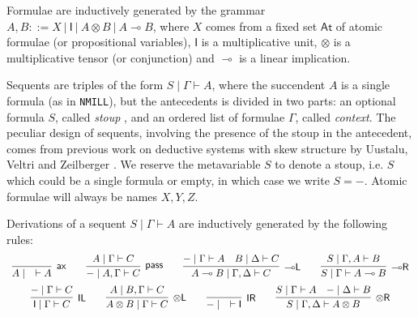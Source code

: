 \documentclass[submission,copyright,creativecommons]{eptcs}
\theoremstyle{definition}
\newtheorem{defn}{Definition}[section]
\newcommand{\tl}{\otimes \mathsf{L}}
\newcommand{\tr}{\otimes \mathsf{R}}
\newcommand{\lright}{{\multimap}\mathsf{R}}
\newcommand{\lleft}{{\multimap}\mathsf{L}}
\newcommand{\pass}{\mathsf{pass}}
\newcommand{\unitl}{\mathsf{IL}}
\newcommand{\unitr}{\mathsf{IR}}
\newcommand{\ax}{\mathsf{ax}}
\newcommand{\ot}{\otimes}
\newcommand{\lolli}{\multimap}
\newcommand{\I}{\mathsf{I}}
\newcommand{\NMILL}{\texttt{NMILL}}
\newcommand{\niccolo}[1]{{\color{red}\textbf{Niccol{\`o}: }#1}}
\begin{document}
Formulae are inductively generated by the grammar $A,B ::= X \ | \ \I \ | \ A \ot B \ | \ A \lolli B$, where $X$ comes from a fixed set $\mathsf{At}$ of atomic formulae (or propositional variables), $\I$ is a multiplicative unit, $\ot$ is a multiplicative tensor (or conjunction) and $\lolli$ is a linear implication.

Sequents are triples of the form $S \mid \Gamma \vdash A$, where the succendent $A$ is a single formula (as in \NMILL), but the antecedents is divided in two parts: an optional formula $S$, called \emph{stoup} \cite{girard:constructive:91}, and an ordered list of formulae $\Gamma$, called \emph{context}. The peculiar design of sequents, involving the presence of the stoup in the antecedent, comes from previous work on deductive systems with skew structure by Uustalu, Veltri and Zeilberger \cite{uustalu:sequent:2021,uustalu:proof:nodate,uustalu:deductive:nodate,veltri:coherence:2021}.
We reserve the metavariable $S$ to denote a stoup, i.e. $S$ which could be a single formula or empty, in which case we write $S = -$. Atomic formulae will always be names $X,Y,Z$.

Derivations of a sequent $S \mid \Gamma \vdash A$ are inductively generated by the following rules:
\begin{equation}\label{eq:seqcalc}
  \def\arraystretch{2.5}
  \begin{array}{c}
    \infer[\ax]{A \mid \quad \vdash A}{}
    \qquad
    \infer[\pass]{- \mid A , \Gamma \vdash C}{A \mid \Gamma \vdash C}
    \qquad
    \infer[\lleft]{A \lolli B \mid \Gamma , \Delta \vdash C}{
      - \mid \Gamma \vdash A
      &
      B \mid \Delta \vdash C
    }
    \qquad
    \infer[\lright]{S \mid \Gamma \vdash A \lolli B}{S \mid \Gamma , A \vdash B}
    \\
    \infer[\unitl]{\I \mid \Gamma \vdash C}{- \mid \Gamma \vdash C}
    \qquad
    \infer[\tl]{A \ot B \mid \Gamma \vdash C}{A \mid B , \Gamma \vdash C}
    \qquad
    \infer[\unitr]{- \mid \quad \vdash \I}{}
    \qquad
    \infer[\tr]{S \mid \Gamma , \Delta \vdash A \ot B}{
      S \mid \Gamma \vdash A
      &
      - \mid \Delta \vdash B
    }
  \end{array}
\end{equation}


\end{document}
